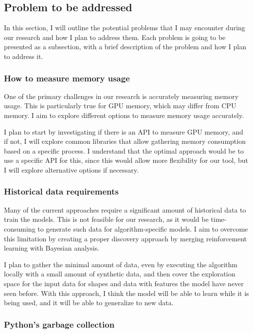 \subsection{Problem to be addressed}
\label{subsec:problems-to-be-addressed}

In this section, I will outline the potential problems that I may encounter during our research and how I plan to address them.
Each problem is going to be presented as a subsection, with a brief description of the problem and how I plan to address it.

\subsubsection{How to measure memory usage}

One of the primary challenges in our research is accurately measuring memory usage.
This is particularly true for GPU memory, which may differ from CPU memory.
I aim to explore different options to measure memory usage accurately.

I plan to start by investigating if there is an API to measure GPU memory, and if not, I will explore common libraries that allow gathering memory consumption based on a specific process.
I understand that the optimal approach would be to use a specific API for this, since this would allow more flexibility for our tool, but I will explore alternative options if necessary.

\subsubsection{Historical data requirements}

Many of the current approaches require a significant amount of historical data to train the models.
This is not feasible for our research, as it would be time-consuming to generate such data for algorithm-specific models.
I aim to overcome this limitation by creating a proper discovery approach by merging reinforcement learning with Bayesian analysis.

I plan to gather the minimal amount of data, even by executing the algorithm locally with a small amount of synthetic data, and then cover the exploration space for the input data for shapes and data with features the model have never seen before.
With this approach, I think the model will be able to learn while it is being used, and it will be able to generalize to new data.

\subsubsection{Python's garbage collection}

